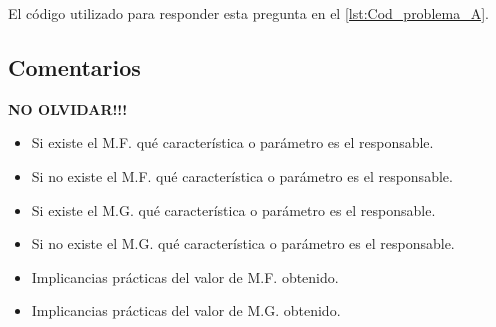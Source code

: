 \vspace*{0.5cm}
El código utilizado para responder esta pregunta en el \autoref{lst:Cod_problema_A}.







\subsection{Comentarios}
\textbf{NO OLVIDAR!!!}

\begin{itemize}
  \item Si existe el M.F. qué característica o parámetro es el responsable.
  \item Si no existe el M.F. qué característica o parámetro es el responsable.
  \item Si existe el M.G. qué característica o parámetro es el responsable.
  \item Si no existe el M.G. qué característica o parámetro es el responsable.
  \item Implicancias prácticas del valor de M.F. obtenido.
  \item Implicancias prácticas del valor de M.G. obtenido.
\end{itemize}




